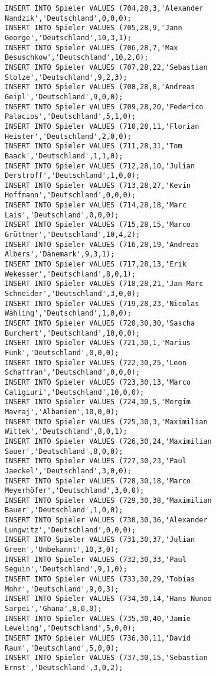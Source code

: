\documentclass{bschlangaul-aufgabe}
\begin{document}
\begin{verbatim}
INSERT INTO Spieler VALUES (704,28,3,'Alexander Nandzik','Deutschland',0,0,0);
INSERT INTO Spieler VALUES (705,28,9,'Jann George','Deutschland',10,3,1);
INSERT INTO Spieler VALUES (706,28,7,'Max Besuschkow','Deutschland',10,2,0);
INSERT INTO Spieler VALUES (707,28,22,'Sebastian Stolze','Deutschland',9,2,3);
INSERT INTO Spieler VALUES (708,28,8,'Andreas Geipl','Deutschland',9,0,0);
INSERT INTO Spieler VALUES (709,28,20,'Federico Palacios','Deutschland',5,1,0);
INSERT INTO Spieler VALUES (710,28,11,'Florian Heister','Deutschland',2,0,0);
INSERT INTO Spieler VALUES (711,28,31,'Tom Baack','Deutschland',1,1,0);
INSERT INTO Spieler VALUES (712,28,10,'Julian Derstroff','Deutschland',1,0,0);
INSERT INTO Spieler VALUES (713,28,27,'Kevin Hoffmann','Deutschland',0,0,0);
INSERT INTO Spieler VALUES (714,28,18,'Marc Lais','Deutschland',0,0,0);
INSERT INTO Spieler VALUES (715,28,15,'Marco Grüttner','Deutschland',10,4,2);
INSERT INTO Spieler VALUES (716,28,19,'Andreas Albers','Dänemark',9,3,1);
INSERT INTO Spieler VALUES (717,28,13,'Erik Wekesser','Deutschland',8,0,1);
INSERT INTO Spieler VALUES (718,28,21,'Jan-Marc Schneider','Deutschland',3,0,0);
INSERT INTO Spieler VALUES (719,28,23,'Nicolas Wähling','Deutschland',1,0,0);
INSERT INTO Spieler VALUES (720,30,30,'Sascha Burchert','Deutschland',10,0,0);
INSERT INTO Spieler VALUES (721,30,1,'Marius Funk','Deutschland',0,0,0);
INSERT INTO Spieler VALUES (722,30,25,'Leon Schaffran','Deutschland',0,0,0);
INSERT INTO Spieler VALUES (723,30,13,'Marco Caligiuri','Deutschland',10,0,0);
INSERT INTO Spieler VALUES (724,30,5,'Mergim Mavraj','Albanien',10,0,0);
INSERT INTO Spieler VALUES (725,30,3,'Maximilian Wittek','Deutschland',8,0,1);
INSERT INTO Spieler VALUES (726,30,24,'Maximilian Sauer','Deutschland',8,0,0);
INSERT INTO Spieler VALUES (727,30,23,'Paul Jaeckel','Deutschland',3,0,0);
INSERT INTO Spieler VALUES (728,30,18,'Marco Meyerhöfer','Deutschland',3,0,0);
INSERT INTO Spieler VALUES (729,30,38,'Maximilian Bauer','Deutschland',1,0,0);
INSERT INTO Spieler VALUES (730,30,36,'Alexander Lungwitz','Deutschland',0,0,0);
INSERT INTO Spieler VALUES (731,30,37,'Julian Green','Unbekannt',10,3,0);
INSERT INTO Spieler VALUES (732,30,33,'Paul Seguin','Deutschland',9,1,0);
INSERT INTO Spieler VALUES (733,30,29,'Tobias Mohr','Deutschland',9,0,3);
INSERT INTO Spieler VALUES (734,30,14,'Hans Nunoo Sarpei','Ghana',8,0,0);
INSERT INTO Spieler VALUES (735,30,40,'Jamie Leweling','Deutschland',5,0,0);
INSERT INTO Spieler VALUES (736,30,11,'David Raum','Deutschland',5,0,0);
INSERT INTO Spieler VALUES (737,30,15,'Sebastian Ernst','Deutschland',3,0,2);

\end{verbatim}
\end{document}
